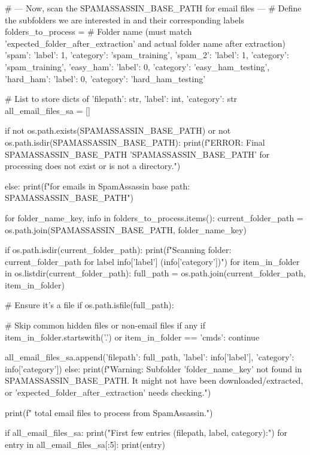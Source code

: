 \begin{ffcode}
# --- Now, scan the SPAMASSASSIN_BASE_PATH for email files ---
# Define the subfolders we are interested in and their corresponding labels
folders_to_process = {
    # Folder name (must match 'expected_folder_after_extraction' and actual folder name after extraction)
    'spam': {'label': 1, 'category': 'spam_training'},
    'spam_2': {'label': 1, 'category': 'spam_training'},
    'easy_ham': {'label': 0, 'category': 'easy_ham_testing'},
    'hard_ham': {'label': 0, 'category': 'hard_ham_testing'}
}

# List to store dicts of {'filepath': str, 'label': int, 'category': str}
all_email_files_sa = []

if not os.path.exists(SPAMASSASSIN_BASE_PATH) or not os.path.isdir(SPAMASSASSIN_BASE_PATH):
    print(f"ERROR: Final SPAMASSASSIN_BASE_PATH '{SPAMASSASSIN_BASE_PATH}' for processing does not exist or is not a directory.")

else:
    print(f"\nScanning for emails in SpamAssassin base path: {SPAMASSASSIN_BASE_PATH}")

    for folder_name_key, info in folders_to_process.items():
        current_folder_path = os.path.join(SPAMASSASSIN_BASE_PATH, folder_name_key)

        if os.path.isdir(current_folder_path):
            print(f"Scanning folder: {current_folder_path} for label {info['label']} ({info['category']})")
            for item_in_folder in os.listdir(current_folder_path):
                full_path = os.path.join(current_folder_path, item_in_folder)

                # Ensure it's a file
                if os.path.isfile(full_path):

                    # Skip common hidden files or non-email files if any
                    if item_in_folder.startswith('.') or item_in_folder == 'cmds':
                        continue

                    all_email_files_sa.append({'filepath': full_path, 'label': info['label'], 'category': info['category']})
        else:
            print(f"Warning: Subfolder '{folder_name_key}' not found in {SPAMASSASSIN_BASE_PATH}. It might not have been downloaded/extracted, or 'expected_folder_after_extraction' needs checking.")

    print(f" total email files to process from SpamAssassin.")

    if all_email_files_sa:
        print("First few entries (filepath, label, category):")
        for entry in all_email_files_sa[:5]:
            print(entry)


\end{ffcode}
